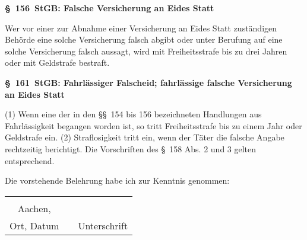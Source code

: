 {\footnotesize 

\textbf{§~156~StGB: Falsche Versicherung an Eides Statt}

%
Wer vor einer zur Abnahme einer Versicherung an Eides Statt zuständigen Behörde eine solche Versicherung falsch abgibt oder unter Berufung auf eine solche Versicherung falsch aussagt, wird mit Freiheitsstrafe bis zu drei Jahren oder mit Geldstrafe bestraft.

\textbf{§~161~StGB: Fahrlässiger Falscheid; fahrlässige falsche Versicherung an Eides Statt }

(1) Wenn eine der in den §§~154 bis 156 bezeichneten Handlungen aus Fahrlässigkeit begangen worden ist, so tritt Freiheitsstrafe bis zu einem Jahr oder Geldstrafe ein. \newline
(2) Straflosigkeit tritt ein, wenn der Täter die falsche Angabe rechtzeitig berichtigt. Die Vorschriften des §~158 Abs. 2 und 3 gelten entsprechend.

\normalsize 
Die vorstehende Belehrung habe ich zur Kenntnis genommen:\\
\begin{tabular}{cp{5cm}c}
	\hspace{5cm}				& & \hspace{4cm} 	\\ 
	Aachen, \IASSubmissionDate 	& &   				\\ \cline{1-1} \cline{3-3} 
	Ort, Datum     				& & Unterschrift 	\\
\end{tabular}
}%
\cleardoublepage